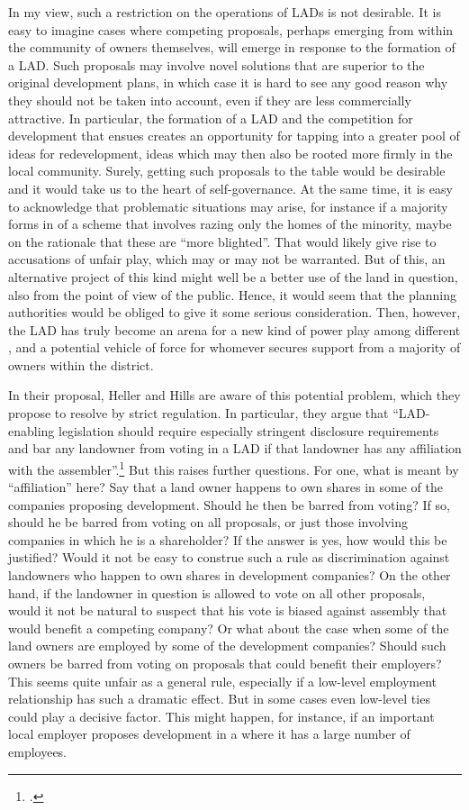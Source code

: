 In my view, such a restriction on the operations of LADs is not desirable. It is easy to imagine cases where competing proposals, perhaps emerging from within the community of owners themselves, will emerge in response to the formation of a LAD. Such proposals may involve novel solutions that are superior to the original development plans, in which case it is hard to see any good reason why they should not be taken into account, even if they are less commercially attractive. In particular, the formation of a LAD and the competition for development that ensues creates an opportunity for tapping into a greater pool of ideas for redevelopment, ideas which may then also be rooted more firmly in the local community. Surely, getting such proposals to the table would be desirable and it would take us to the heart of self-governance. At the same time, it is easy to acknowledge that problematic situations may arise, for instance if a majority forms in  of a scheme that involves razing only the homes of the minority, maybe on the rationale that these are ``more blighted''. That would likely give rise to accusations of unfair play, which may or may not be warranted. But  of this, an alternative project of this kind might well be a better use of the land in question, also from the point of view of the public. Hence, it would seem that the planning authorities would be obliged to give it some serious consideration. Then, however, the LAD has truly become an arena for a new kind of power play among different , and a potential vehicle of force for whomever secures support from a majority of owners within the district.

In their proposal, Heller and Hills are aware of this potential problem, which they propose to resolve by strict regulation. In particular, they argue that ``LAD-enabling legislation should require especially stringent disclosure requirements and bar any landowner from voting in a LAD if that landowner has any affiliation with the assembler''.\footcite{heller08} But this raises further questions. For one, what is meant by ``affiliation'' here? Say that a land owner happens to own shares in some of the companies proposing development. Should he then be barred from voting? If so, should he be barred from voting on all proposals, or just those involving companies in which he is a shareholder? If the answer is yes, how would this be justified? Would it not be easy to construe such a rule as discrimination against landowners who happen to own shares in development companies? On the other hand, if the landowner in question is allowed to vote on all other proposals, would it not be natural to suspect that his vote is biased against assembly that would benefit a competing company? Or what about the case when some of the land owners are employed by some of the development companies? Should such owners be barred from voting on proposals that could benefit their employers? This seems quite unfair as a general rule, especially if a low-level employment relationship has such a dramatic effect. But in some cases even low-level ties could play a decisive factor. This might happen, for instance, if an important local employer proposes development in a  where it has a large number of employees.

